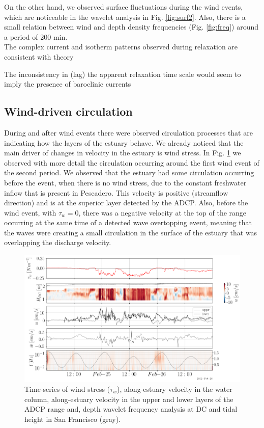 \documentclass[tesis.tex]{subfiles}
\begin{document}
On the other hand, we observed surface fluctuations during the wind events, which are noticeable in the wavelet analysis in Fig. \ref{fig:surf2}. Also, there is a small relation between wind and depth density frequencies (Fig. \ref{fig:freq}) around a period of 200 min.\\

The complex current and isotherm patterns observed during relaxation are consistent with theory

The inconsistency in (lag) the apparent relaxation time scale would seem to imply the presence of baroclinic currents

\subsection{Wind-driven circulation}

During and after wind events there were observed circulation processes that are indicating how the layers of the estuary behave. We already noticed that the main driver of changes in velocity in the estuary is wind stress. In Fig. \ref{fig:velwind} we observed with more detail the circulation occurring around the first wind event of the second period. We observed that the estuary had some circulation occurring before the event, when there is no wind stress, due to the constant freshwater inflow that is present in Pescadero. This velocity is positive (streamflow direction) and is at the superior layer detected by the ADCP. Also, before the wind event, with $\tau_w =0$, there was a negative velocity at the top of the range occurring at the same time of a detected wave overtopping event, meaning that the waves were creating a small circulation in the surface of the estuary that was overlapping the discharge velocity.\\

\begin{figure}[h!]
    \centering
    \includegraphics[width=\textwidth]{Imagenes/vel_wind.png}
    \caption{Time-series of wind stress ($\tau_w$), along-estuary velocity in the water column, along-estuary velocity in the upper and lower layers of the ADCP range and, depth wavelet frequency analysis at DC and tidal height in San Francisco (gray). }
    \label{fig:velwind}
\end{figure}
\end{document}
